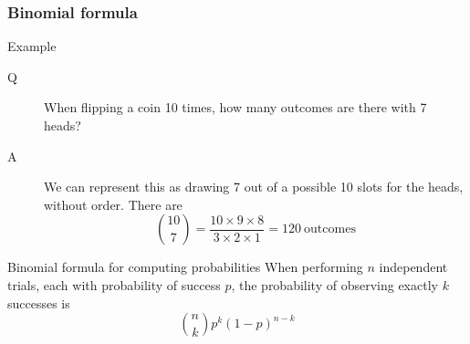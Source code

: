 \documentclass[handout]{beamer}
\begin{document}

   \begin{frame} \frametitle{Binomial formula}

   \begin{block}
   {Example}

   \begin{description}
   \item[Q]    When flipping a coin 10 times, how many outcomes are there
   with 7 heads?

   \item[A] We can represent this as drawing 7 out of a possible
   10 slots for the heads, without order. There are
   $$
   \binom{10}{7} = \frac{10 \times 9 \times 8}{3 \times 2 \times 1} = 120 \
   \text{outcomes}   $$
   \end{description}

   \end{block}

   \begin{block}
   {Binomial formula for computing probabilities}
   When performing $n$ independent trials, each
   with probability of success $p$, the probability
   of observing exactly $k$ successes is
   $$
   \binom{n}{ k} { p^k} {(1-p)^ {n-k}}
   $$
   \end{block}
   \end{frame}


   \begin{frame} 

   \end{frame}

   
\end{document}

